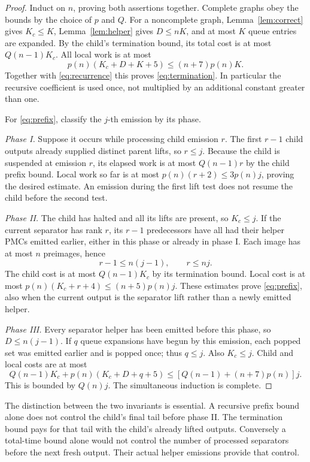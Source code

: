 \documentclass[acmsmall,12pt,screen,nonacm]{acmart}
\begin{document}
\begin{proof}
Induct on $n$, proving both assertions together. Complete graphs obey the
bounds by the choice of $p$ and $Q$. For a noncomplete graph,
Lemma~\ref{lem:correct} gives $K_c\le K$, Lemma~\ref{lem:helper} gives
$D\le nK$, and at most $K$ queue entries are expanded. By the child's
termination bound, its total cost is at most $Q(n-1)K_c$. All local work
is at most
\[
 p(n)(K_c+D+K+5)\le(n+7)p(n)K.
\]
Together with \eqref{eq:recurrence} this proves \eqref{eq:termination}.
In particular the recursive coefficient is used once, not multiplied by an
additional constant greater than one.

For \eqref{eq:prefix}, classify the $j$-th emission by its phase.

\emph{Phase I.} Suppose it occurs while processing child emission $r$.
The first $r-1$ child outputs already supplied distinct parent lifts, so
$r\le j$. Because the child is suspended at emission $r$, its elapsed work
is at most $Q(n-1)r$ by the child prefix bound. Local work so far is at most
$p(n)(r+2)\le3p(n)j$, proving the desired estimate. An emission during
the first lift test does not resume the child before the second test.

\emph{Phase II.} The child has halted and all its lifts are present, so
$K_c\le j$. If the current separator has rank $r$, its $r-1$ predecessors
have all had their helper PMCs emitted earlier, either in this phase or
already in phase I. Each image has at most $n$ preimages, hence
\[
 r-1\le n(j-1),\qquad r\le nj.
\]
The child cost is at most $Q(n-1)K_c$ by its termination bound. Local cost
is at most $p(n)(K_c+r+4)\le(n+5)p(n)j$. These estimates prove
\eqref{eq:prefix}, also when the current output is the separator lift rather
than a newly emitted helper.

\emph{Phase III.} Every separator helper has been emitted before this phase,
so $D\le n(j-1)$. If $q$ queue expansions have begun by this emission,
each popped set was emitted earlier and is popped once; thus $q\le j$.
Also $K_c\le j$. Child and local costs are at most
\[
 Q(n-1)K_c+p(n)(K_c+D+q+5)
 \le [Q(n-1)+(n+7)p(n)]j.
\]
This is bounded by $Q(n)j$. The simultaneous induction is complete.
\end{proof}

The distinction between the two invariants is essential. A recursive prefix
bound alone does not control the child's final tail before phase II.
The termination bound pays for that tail with the child's already lifted
outputs. Conversely a total-time bound alone would not control the number
of processed separators before the next fresh output. Their actual helper
emissions provide that control.
\end{document}
